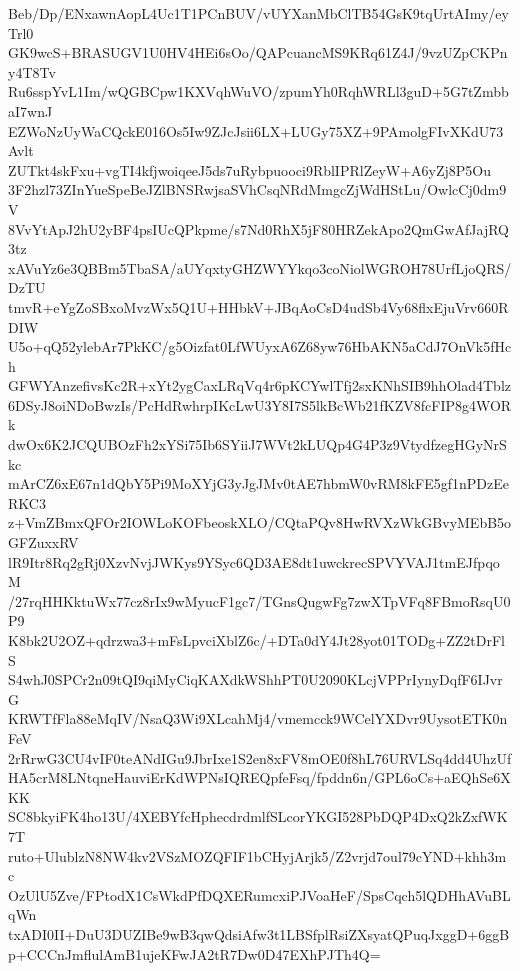 Beb/Dp/ENxawnAopL4Uc1T1PCnBUV/vUYXanMbClTB54GsK9tqUrtAImy/eyTrl0
GK9wcS+BRASUGV1U0HV4HEi6sOo/QAPcuancMS9KRq61Z4J/9vzUZpCKPny4T8Tv
Ru6sspYvL1Im/wQGBCpw1KXVqhWuVO/zpumYh0RqhWRLl3guD+5G7tZmbbaI7wnJ
EZWoNzUyWaCQckE016Os5Iw9ZJcJsii6LX+LUGy75XZ+9PAmolgFIvXKdU73Avlt
ZUTkt4skFxu+vgTI4kfjwoiqeeJ5ds7uRybpuooci9RblIPRlZeyW+A6yZj8P5Ou
3F2hzl73ZInYueSpeBeJZlBNSRwjsaSVhCsqNRdMmgcZjWdHStLu/OwlcCj0dm9V
8VvYtApJ2hU2yBF4psIUcQPkpme/s7Nd0RhX5jF80HRZekApo2QmGwAfJajRQ3tz
xAVuYz6e3QBBm5TbaSA/aUYqxtyGHZWYYkqo3coNiolWGROH78UrfLjoQRS/DzTU
tmvR+eYgZoSBxoMvzWx5Q1U+HHbkV+JBqAoCsD4udSb4Vy68flxEjuVrv660RDIW
U5o+qQ52ylebAr7PkKC/g5Oizfat0LfWUyxA6Z68yw76HbAKN5aCdJ7OnVk5fHch
GFWYAnzefivsKc2R+xYt2ygCaxLRqVq4r6pKCYwlTfj2sxKNhSIB9hhOlad4Tblz
6DSyJ8oiNDoBwzIs/PcHdRwhrpIKcLwU3Y8I7S5lkBcWb21fKZV8fcFIP8g4WORk
dwOx6K2JCQUBOzFh2xYSi75Ib6SYiiJ7WVt2kLUQp4G4P3z9VtydfzegHGyNrSkc
mArCZ6xE67n1dQbY5Pi9MoXYjG3yJgJMv0tAE7hbmW0vRM8kFE5gf1nPDzEeRKC3
z+VmZBmxQFOr2IOWLoKOFbeoskXLO/CQtaPQv8HwRVXzWkGBvyMEbB5oGFZuxxRV
lR9Itr8Rq2gRj0XzvNvjJWKys9YSyc6QD3AE8dt1uwckrecSPVYVAJ1tmEJfpqoM
/27rqHHKktuWx77cz8rIx9wMyucF1gc7/TGnsQugwFg7zwXTpVFq8FBmoRsqU0P9
K8bk2U2OZ+qdrzwa3+mFsLpvciXblZ6c/+DTa0dY4Jt28yot01TODg+ZZ2tDrFlS
S4whJ0SPCr2n09tQI9qiMyCiqKAXdkWShhPT0U2090KLcjVPPrIynyDqfF6IJvrG
KRWTfFla88eMqIV/NsaQ3Wi9XLcahMj4/vmemcck9WCelYXDvr9UysotETK0nFeV
2rRrwG3CU4vIF0teANdIGu9JbrIxe1S2en8xFV8mOE0f8hL76URVLSq4dd4UhzUf
HA5crM8LNtqneHauviErKdWPNsIQREQpfeFsq/fpddn6n/GPL6oCs+aEQhSe6XKK
SC8bkyiFK4ho13U/4XEBYfcHphecdrdmlfSLcorYKGI528PbDQP4DxQ2kZxfWK7T
ruto+UlublzN8NW4kv2VSzMOZQFIF1bCHyjArjk5/Z2vrjd7oul79cYND+khh3mc
OzUlU5Zve/FPtodX1CsWkdPfDQXERumcxiPJVoaHeF/SpsCqch5lQDHhAVuBLqWn
txADI0II+DuU3DUZIBe9wB3qwQdsiAfw3t1LBSfplRsiZXsyatQPuqJxggD+6ggB
p+CCCnJmflulAmB1ujeKFwJA2tR7Dw0D47EXhPJTh4Q=
